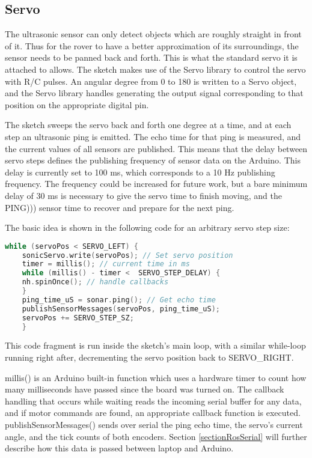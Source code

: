 \subsection{Servo}
The ultrasonic sensor can only detect objects which are roughly straight in front of it. Thus for the rover to have a better approximation of its surroundings, the sensor needs to be panned back and forth. This is what the standard servo it is attached to allows. The sketch makes use of the Servo library to control the servo with R/C pulses. An angular degree from 0 to 180 is written to a Servo object, and the Servo library handles generating the output signal corresponding to that position on the appropriate digital pin.

The sketch sweeps the servo back and forth one degree at a time, and at each step an ultrasonic ping is emitted. The echo time for that ping is measured, and the current values of all sensors are published. This means that the delay between servo steps defines the publishing frequency of sensor data on the Arduino. This delay is currently set to 100 ms, which corresponds to a 10 Hz publishing frequency. The frequency could be increased for future work, but a bare minimum delay of 30 ms is necessary to give the servo time to finish moving, and the PING))) sensor time to recover and prepare for the next ping.

The basic idea is shown in the following code for an arbitrary servo step size:
\begin{mdframed}[backgroundcolor=light-gray, roundcorner=10pt,leftmargin=1, rightmargin=1, innerleftmargin=15, innertopmargin=15,innerbottommargin=15, outerlinewidth=1, linecolor=light-gray]
	\begin{lstlisting}[language=C++]
	while (servoPos < SERVO_LEFT) {
	sonicServo.write(servoPos); // Set servo position
	timer = millis(); // current time in ms
	while (millis() - timer <  SERVO_STEP_DELAY) {
	nh.spinOnce(); // handle callbacks
	}
	ping_time_uS = sonar.ping(); // Get echo time
	publishSensorMessages(servoPos, ping_time_uS);
	servoPos += SERVO_STEP_SZ;
	}
	\end{lstlisting}
\end{mdframed}

This code fragment is run inside the sketch's main loop, with a similar while-loop running right after, decrementing the servo position back to SERVO\_RIGHT.

millis() is an Arduino built-in function which uses a hardware timer to count how many milliseconds have passed since the board was turned on. The callback handling that occurs while waiting reads the incoming serial buffer for any data, and if motor commands are found, an appropriate callback function is executed. publishSensorMessages() sends over serial the ping echo time, the servo's current angle, and the tick counts of both encoders. Section \ref{sectionRosSerial} will further describe how this data is passed between laptop and Arduino.

